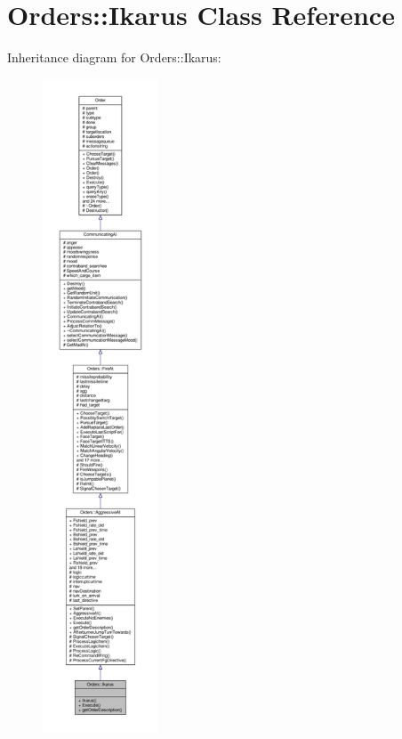 \hypertarget{classOrders_1_1Ikarus}{}\section{Orders\+:\+:Ikarus Class Reference}
\label{classOrders_1_1Ikarus}


Inheritance diagram for Orders\+:\+:Ikarus\+:
\nopagebreak
\begin{figure}[H]
\begin{center}
\leavevmode
\includegraphics[height=550pt]{d6/d92/classOrders_1_1Ikarus__inherit__graph}
\end{center}
\end{figure}


